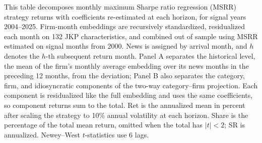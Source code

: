 \begin{table}[htbp]
\centering
\caption{MSRR Strategy Decomposition with Re-estimated Weights}
\label{tab:tabA_reoptimized}
\begin{minipage}{\linewidth}\footnotesize
This table decomposes monthly maximum Sharpe ratio regression (MSRR) strategy returns with coefficients re-estimated at each horizon, for signal years 2004--2025. Firm-month embeddings are recursively standardized, residualized each month on 132 JKP characteristics, and combined out of sample using MSRR estimated on signal months from 2000. News is assigned by arrival month, and $h$ denotes the $h$-th subsequent return month. Panel A separates the historical level, the mean of the firm's monthly average embedding over its news months in the preceding 12 months, from the deviation; Panel B also separates the category, firm, and idiosyncratic components of the two-way category--firm projection. Each component is residualized like the full embedding and uses the same coefficients, so component returns sum to the total. Ret is the annualized mean in percent after scaling the strategy to 10\% annual volatility at each horizon. Share is the percentage of the total mean return, omitted when the total has $|t|<2$; SR is annualized. Newey--West $t$-statistics use 6 lags.
\end{minipage}
\medskip


\end{table}

